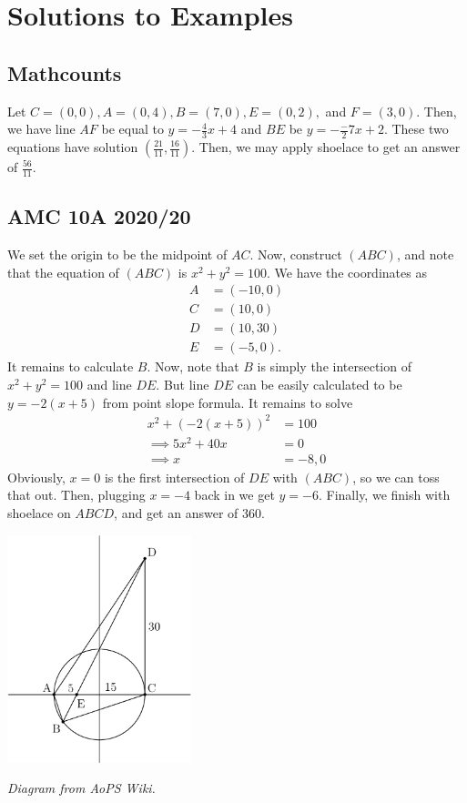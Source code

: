 \documentclass[11pt]{scrartcl}
\begin{document}
\pagebreak

\appendix

\section{Solutions to Examples}
\subsection{Mathcounts}
Let $C = (0,0), A = (0, 4), B = (7, 0), E = (0, 2), $ and $F = (3, 0)$. Then, we have line $AF$ be equal to $y=-\frac 43 x + 4$ and $BE$ be $y=-\frac -27 x + 2$. These two equations have solution $(\frac{21}{11},\frac{16}{11})$. Then, we may apply shoelace to get an answer of $\boxed{\frac{56}{11}}$. 

\subsection{AMC 10A 2020/20}
We set the origin to be the midpoint of $AC$. Now, construct $(ABC)$, and note that the equation of $(ABC)$ is $x^2+y^2=100$. We have the coordinates as
\begin{align*}
    A&=(-10,0)\\
    C&=(10,0)\\
    D&=(10,30)\\
    E&=(-5,0).
\end{align*}
It remains to calculate $B$. Now, note that $B$ is simply the intersection of $x^2+y^2=100$ and line $DE$. But line $DE$ can be easily calculated to be $y=-2(x+5)$ from point slope formula. It remains to solve 
\begin{align*}
    x^2+(-2(x+5))^2&=100\\
    \implies 5x^2+40x&=0\\
    \implies x&=-8,0
\end{align*}
Obviously, $x=0$ is the first intersection of $DE$ with $(ABC)$, so we can toss that out. Then, plugging $x=-4$ back in we get $y=-6$. Finally, we finish with shoelace on $ABCD$, and get an answer of $\boxed{360}$.

\begin{center}

\includegraphics[width = 0.4\textwidth]{amc10a202020.png}
    
   
    \textit{Diagram from AoPS Wiki.}
\end{center}
\end{document}
